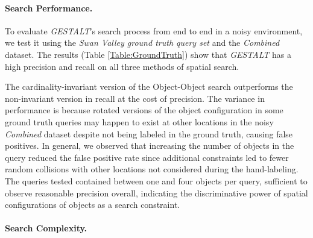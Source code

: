 \paragraph{Search Performance.}

To evaluate \emph{GESTALT}'s search process from end to end in a noisy environment, we test it using the \textit{Swan Valley ground truth query set} and the \textit{Combined} dataset.
The results (Table \ref{Table:GroundTruth}) show that \emph{GESTALT} has a high precision and recall on all three methods of spatial search.

The cardinality-invariant version of the Object-Object search outperforms the non-invariant version in recall at the cost of precision.
The variance in performance is because rotated versions of the object configuration in some ground truth queries may happen to exist at other locations in the noisy \textit{Combined} dataset despite not being labeled in the ground truth, causing false positives.
In general, we observed that increasing the number of objects in the query reduced the false positive rate since additional constraints led to fewer random collisions with other locations not considered during the hand-labeling.
The queries tested contained between one and four objects per query, sufficient to observe reasonable precision overall, indicating the discriminative power of spatial configurations of objects as a search constraint.



\paragraph{Search Complexity.}

